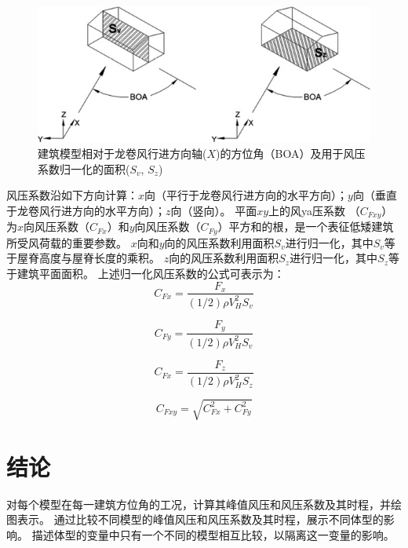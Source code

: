 \documentclass{ctexart}
\begin{document}
\begin{figure}
\centering
\includegraphics{./fig/3}
\caption{建筑模型相对于龙卷风行进方向轴($X$)的方位角（BOA）及用于风压系数归一化的面积($S_v$, $S_z$)}
\label{fig:BOA}
\end{figure}


风压系数沿如下方向计算：$x$向（平行于龙卷风行进方向的水平方向）；$y$向（垂直于龙卷风行进方向的水平方向）；$z$向（竖向）。
平面$xy$上的风ya压系数 （$C_{Fxy}$）为$x$向风压系数（$C_{Fx}$）和$y$向风压系数（$C_{Fy}$）平方和的根，是一个表征低矮建筑所受风荷载的重要参数。
$x$向和$y$向的风压系数利用面积$S_v$进行归一化，其中$S_v$等于屋脊高度与屋脊长度的乘积。
$z$向的风压系数利用面积$S_z$进行归一化，其中$S_z$等于建筑平面面积。
上述归一化风压系数的公式可表示为：
\begin{equation}
	C_{Fx}=\frac{F_x}{(1/2)\rho V_H^2 S_v}
\end{equation}

\begin{equation}
	C_{Fy}=\frac{F_y}{(1/2)\rho V_H^2 S_v}
\end{equation}

\begin{equation}
	C_{Fx}=\frac{F_z}{(1/2)\rho V_H^2 S_z}
\end{equation}

\begin{equation}
	C_{Fxy}=\sqrt{C_{Fx}^2+C_{Fy}^2}
\end{equation}

\section{结论}
对每个模型在每一建筑方位角的工况，计算其峰值风压和风压系数及其时程，并绘图表示。
通过比较不同模型的峰值风压和风压系数及其时程，展示不同体型的影响。
描述体型的变量中只有一个不同的模型相互比较，以隔离这一变量的影响。
\end{document}
